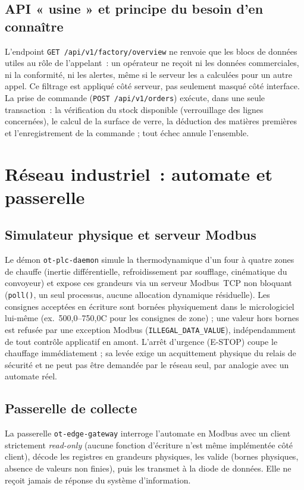 \documentclass[11pt,a4paper]{report}
\begin{document}
\section{API « usine » et principe du besoin d'en connaître}
L'endpoint \texttt{GET~/api/v1/factory/overview} ne renvoie que les blocs de
données utiles au rôle de l'appelant~: un opérateur ne reçoit ni les données
commerciales, ni la conformité, ni les alertes, même si le serveur les a
calculées pour un autre appel. Ce filtrage est appliqué côté serveur, pas
seulement masqué côté interface. La prise de commande
(\texttt{POST~/api/v1/orders}) exécute, dans une seule transaction~: la
vérification du stock disponible (verrouillage des lignes concernées), le
calcul de la surface de verre, la déduction des matières premières et
l'enregistrement de la commande ; tout échec annule l'ensemble.

\chapter{Réseau industriel~: automate et passerelle}

\section{Simulateur physique et serveur Modbus}
Le démon \texttt{ot-plc-daemon} simule la thermodynamique d'un four à quatre
zones de chauffe (inertie différentielle, refroidissement par soufflage,
cinématique du convoyeur) et expose ces grandeurs via un serveur Modbus~TCP
non bloquant (\texttt{poll()}, un seul processus, aucune allocation
dynamique résiduelle). Les consignes acceptées en écriture sont bornées
physiquement dans le micrologiciel lui-même (ex.~500,0--750,0\textdegree{}C
pour les consignes de zone) ; une valeur hors bornes est refusée par une
exception Modbus (\texttt{ILLEGAL\_DATA\_VALUE}), indépendamment de tout
contrôle applicatif en amont. L'arrêt d'urgence (E-STOP) coupe le chauffage
immédiatement ; sa levée exige un acquittement physique du relais de
sécurité et ne peut pas être demandée par le réseau seul, par analogie avec
un automate réel.

\section{Passerelle de collecte}
La passerelle \texttt{ot-edge-gateway} interroge l'automate en Modbus avec un
client strictement \emph{read-only} (aucune fonction d'écriture n'est même
implémentée côté client), décode les registres en grandeurs physiques, les
valide (bornes physiques, absence de valeurs non finies), puis les transmet
à la diode de données. Elle ne reçoit jamais de réponse du système
d'information.
\end{document}
